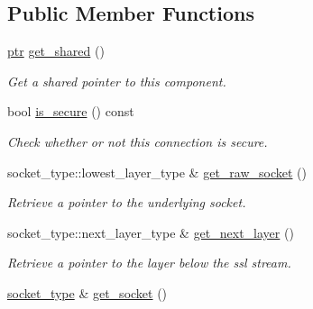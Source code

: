 \subsection*{Public Member Functions}
\begin{DoxyCompactItemize}
\item 
\mbox{\label{classwebsocketpp_1_1transport_1_1asio_1_1tls__socket_1_1connection_ab03c718432a6b2020e8315d137930945}} 
\mbox{\hyperlink{classwebsocketpp_1_1transport_1_1asio_1_1tls__socket_1_1connection_a2aa605c27a476eba644e062dc5bc4f6d}{ptr}} \mbox{\hyperlink{classwebsocketpp_1_1transport_1_1asio_1_1tls__socket_1_1connection_ab03c718432a6b2020e8315d137930945}{get\+\_\+shared}} ()
\begin{DoxyCompactList}\small\item\em Get a shared pointer to this component. \end{DoxyCompactList}\item 
bool \mbox{\hyperlink{classwebsocketpp_1_1transport_1_1asio_1_1tls__socket_1_1connection_a0fd08b2eb100016f0f534aacf6caa8e3}{is\+\_\+secure}} () const
\begin{DoxyCompactList}\small\item\em Check whether or not this connection is secure. \end{DoxyCompactList}\item 
socket\+\_\+type\+::lowest\+\_\+layer\+\_\+type \& \mbox{\hyperlink{classwebsocketpp_1_1transport_1_1asio_1_1tls__socket_1_1connection_af8863f2d811106240b9ef43f6868c918}{get\+\_\+raw\+\_\+socket}} ()
\begin{DoxyCompactList}\small\item\em Retrieve a pointer to the underlying socket. \end{DoxyCompactList}\item 
socket\+\_\+type\+::next\+\_\+layer\+\_\+type \& \mbox{\hyperlink{classwebsocketpp_1_1transport_1_1asio_1_1tls__socket_1_1connection_a5105586ade9ca6e016f308b0aebfcb3c}{get\+\_\+next\+\_\+layer}} ()
\begin{DoxyCompactList}\small\item\em Retrieve a pointer to the layer below the ssl stream. \end{DoxyCompactList}\item 
\mbox{\hyperlink{classwebsocketpp_1_1transport_1_1asio_1_1tls__socket_1_1connection_a99c358b4afc58ee1b1b60cf32fcf5c87}{socket\+\_\+type}} \& \mbox{\hyperlink{classwebsocketpp_1_1transport_1_1asio_1_1tls__socket_1_1connection_af86b843634236dee59431078a23b3527}{get\+\_\+socket}} ()

\end{DoxyCompactItemize}
